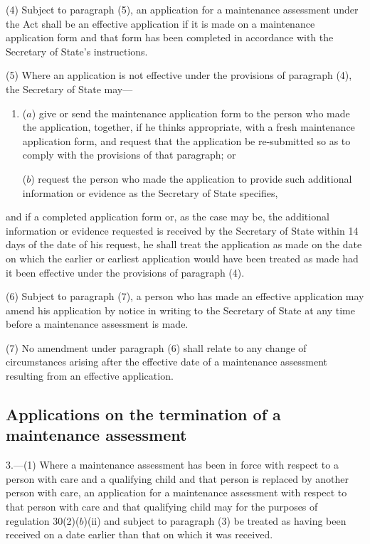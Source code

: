 \documentclass[a4paper,12pt]{article}
\begin{document}
(4) Subject to paragraph (5), an application for a maintenance assessment under the Act shall be an effective application if it is made on a maintenance application form and that form has been completed in accordance with the Secretary of State’s instructions.

(5) Where an application is not effective under the provisions of paragraph (4), the Secretary of State may—
\begin{enumerate}\item[]
($a$) give or send the maintenance application form to the person who made the application, together, if he thinks appropriate, with a fresh maintenance application form, and request that the application be re-submitted so as to comply with the provisions of that paragraph; or

($b$) request the person who made the application to provide such additional information or evidence as the Secretary of State specifies,
\end{enumerate}
and if a completed application form or, as the case may be, the additional information or evidence requested is received by the Secretary of State within 14 days of the date of his request, he shall treat the application as made on the date on which the earlier or earliest application would have been treated as made had it been effective under the provisions of paragraph (4).

(6) Subject to paragraph (7), a person who has made an effective application may amend his application by notice in writing to the Secretary of State at any time before a maintenance assessment is made.

(7) No amendment under paragraph (6) shall relate to any change of circumstances arising after the effective date of a maintenance assessment resulting from an effective application.

\subsection[3. Applications on the termination of a maintenance assessment]{Applications on the termination of a maintenance assessment}

3.—(1) Where a maintenance assessment has been in force with respect to a person with care and a qualifying child and that person is replaced by another person with care, an application for a maintenance assessment with respect to that person with care and that qualifying child may for the purposes of regulation 30(2)($b$)(ii) and subject to paragraph (3) be treated as having been received on a date earlier than that on which it was received.
\end{document}
